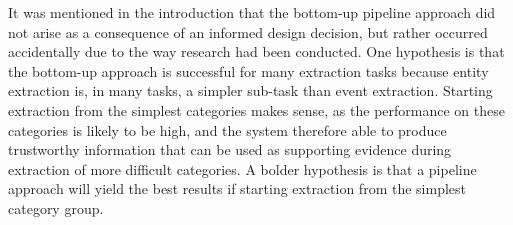 It was mentioned in the introduction that the bottom-up pipeline approach did not arise as a consequence of an informed design decision, but rather occurred accidentally due to the way research had been conducted. One hypothesis is that the bottom-up approach is successful for many extraction tasks because entity extraction is, in many tasks, a simpler sub-task than event extraction. Starting extraction from the simplest categories makes sense, as the performance on these categories is likely to be high, and the system therefore able to produce trustworthy information that can be used as supporting evidence during extraction of more difficult categories. A bolder hypothesis is that a pipeline approach will yield the best results if starting extraction from the simplest category group.
